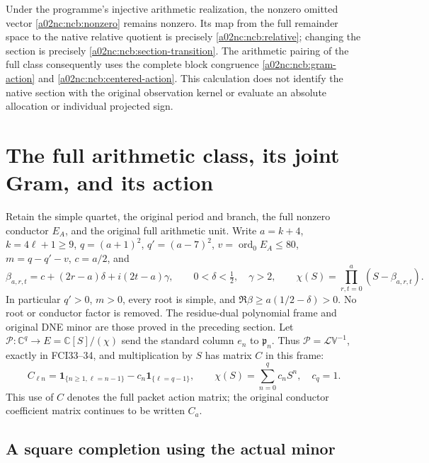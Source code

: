 \documentclass[11pt,a4paper]{article}
\begin{document}
Under the programme's injective arithmetic realization, the nonzero
omitted vector \eqref{a02nc:ncb:nonzero} remains nonzero. Its map from the
full remainder space to the native relative quotient is precisely
\eqref{a02nc:ncb:relative}; changing the section is precisely
\eqref{a02nc:ncb:section-transition}. The arithmetic pairing of the full
class consequently uses the complete block congruence
\eqref{a02nc:ncb:gram-action} and \eqref{a02nc:ncb:centered-action}.
This calculation does not identify the native section with the
original observation kernel or evaluate an absolute allocation or
individual projected sign.


\section{The full arithmetic class, its joint Gram, and its action}

Retain the simple quartet, the original period and branch, the full
nonzero conductor $E_A$, and the original full arithmetic unit.
Write $a=k+4$, $k=4\ell+1\ge9$,
$q=(a+1)^2$, $q'=(a-7)^2$, $v=\operatorname{ord}_0E_A\le80$,
$m=q-q'-v$, $c=a/2$, and
\[
 \beta_{a,r,t}=c+(2r-a)\delta+i(2t-a)\gamma,\qquad
 0<\delta<\tfrac12,\quad \gamma>2,\qquad
 \chi(S)=\prod_{r,t=0}^{a}(S-\beta_{a,r,t}).
 \tag{NCRP1}
\]
In particular $q'>0$, $m>0$, every root is simple, and
$\Re\beta\ge a(1/2-\delta)>0$. No root or conductor factor is
removed. The residue-dual polynomial frame and original DNE minor
are those proved in the preceding section. Let
$\mathscr P:\mathbb C^q\to E=\mathbb C[S]/(\chi)$ send the standard
column $e_n$ to $\mathfrak p_n$.
Thus $\mathscr P=\mathcal L\mathbb V^{-1}$, exactly in FCI33--34,
and multiplication by $S$ has matrix $C$ in this frame:
\[
 C_{\ell n}=\mathbf1_{\{n\ge1,\ell=n-1\}}
              -c_n\mathbf1_{\{\ell=q-1\}},\qquad
 \chi(S)=\sum_{n=0}^{q}c_nS^n,\quad c_q=1.
 \tag{NCRP2}
\]
This use of $C$ denotes the full packet action matrix; the original
conductor coefficient matrix continues to be written $C_a$.

\subsection{A square completion using the actual minor}
\end{document}
